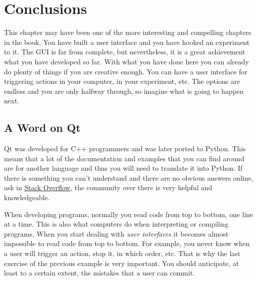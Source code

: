 

\section{Conclusions}\label{conclusions}
This chapter may have been one of the more interesting and compelling
chapters in the book. You have built a user interface and you have
hooked an experiment to it. The {GUI} is far from complete, but
nevertheless, it is a great achievement what you have developed so far.
With what you have done here you can already do plenty of things if you
are creative enough. You can have a user interface for triggering
actions in your computer, in your experiment, etc. The options are
endless and you are only halfway through, so imagine what is going to
happen next.

\subsection{A Word on Qt}\label{a-word-onqt}
Qt was developed for C++ programmers and was later ported to Python.
This means that a lot of the documentation and examples that you can
find around are for another language and thus you will need to translate
it into Python. If there is something you can't understand and there are
no obvious answers online, ask in
\href{https://stackoverflow.com/}{Stack Overflow}, the community over
there is very helpful and knowledgeable.

When developing programs, normally you read code from top to bottom, one
line at a time. This is also what computers do when interpreting or
compiling programs. When you start dealing with \emph{user interfaces}
it becomes almost impossible to read code from top to bottom. For
example, you never know when a user will trigger an action, stop it, in
which order, etc. That is why the last exercise of the previous example
is very important. You should anticipate, at least to a certain extent,
the mistakes that a user can commit.

